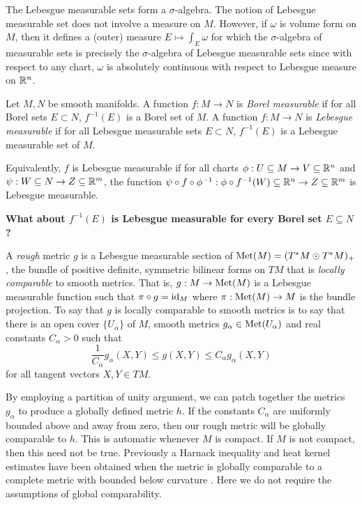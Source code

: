 \documentclass{amsart}
\begin{document}
\begin{rem}
The Lebesgue measurable sets form a \(\sigma\)-algebra. The notion of Lebesgue measurable set does not involve a measure on \(M\). However, if \(\omega\) is volume form on \(M\), then it defines a (outer) measure \(E \mapsto \int_E \omega\) for which the \(\sigma\)-algebra of measurable sets is precisely the \(\sigma\)-algebra of Lebesgue measurable sets since with respect to any chart, \(\omega\) is absolutely continuous with respect to Lebesgue measure on \(\mathbb{R}^n\).
\end{rem}

\begin{defn}
Let \(M, N\) be smooth manifolds. A function \(f : M \to N\) is \emph{Borel measurable} if for all Borel sets \(E \subset N\), \(f^{-1} (E)\) is a Borel set of \(M\). A function \(f : M \to N\) is \emph{Lebesgue measurable} if for all Lebesgue measurable sets \(E \subset N\), \(f^{-1} (E)\) is a Lebesgue measurable set of \(M\).
\end{defn}

\begin{rem}
Equivalently, \(f\) is Lebesgue measurable if for all charts \(\phi : U \subseteq M \to V \subseteq \mathbb{R}^n\) and \(\psi: W \subseteq N \to Z \subseteq \mathbb{R}^m\), the function \(\psi \circ f \circ \phi^{-1} : \phi \circ f^{-1} (W) \subseteq \mathbb{R}^n \to Z \subseteq \mathbb{R}^m\) is Lebesgue measurable.
\end{rem}

\textbf{What about \(f^{-1}(E)\) is Lebesgue measurable for every Borel set \(E \subseteq N\)?}

\begin{defn}
A \emph{rough} metric \(g\) is a Lebesgue measurable section of \(\operatorname{Met}(M) = (T^{\ast} M \odot T^{\ast} M)_+\), the bundle of positive definite, symmetric bilinear forms on \(TM\) that is \emph{locally comparable} to smooth metrics. That is, \(g : M \to \operatorname{Met}(M)\) is a Lebesgue measurable function such that \(\pi \circ g = \operatorname{id}_M\) where \(\pi: \operatorname{Met}(M) \to M\) is the bundle projection. To say that \(g\) is locally comparable to smooth metrics is to say that there is an open cover \(\lbrace U_{\alpha} \rbrace\) of \(M\), smooth metrics \(g_{\alpha} \in \operatorname{Met}(U_{\alpha})\) and real constants \(C_{\alpha} > 0\) such that
\[
\frac{1}{C_{\alpha}} g_{\alpha} (X, Y) \leq g(X, Y) \leq C_{\alpha} g_{\alpha} (X, Y)
\]
for all tangent vectors \(X, Y \in TM\).
\end{defn}

\begin{rem}
By employing a partition of unity argument, we can patch together the metrics \(g_{\alpha}\) to produce a globally defined metric \(h\). If the constants \(C_{\alpha}\) are uniformly bounded above and away from zero, then our rough metric will be globally comparable to \(h\). This is automatic whenever \(M\) is compact. If \(M\) is not compact, then this need not be true. Previously a Harnack inequality and heat kernel estimates have been obtained when the metric is globally comparable to a complete metric with bounded below curvature \cite{Saloff-Coste:/1992b}. Here we do not require the assumptions of global comparability.
\end{rem}
\end{document}
